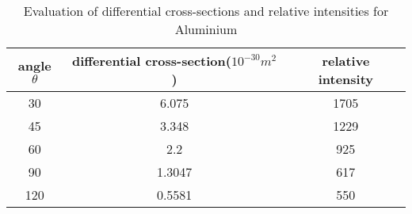 \begin{table}
    \centering
    \begin{tabular}{|c|c|c|}
        \hline
        angle $\theta$ & differential cross-section($10^{-30}m^2$) & relative intensity \\ \hline
        30             & 6.075                                     & 1705               \\ \hline
        45             & 3.348                                     & 1229               \\ \hline
        60             & 2.2                                       & 925                \\ \hline
        90             & 1.3047                                    & 617                \\ \hline
        120            & 0.5581                                    & 550                \\ \hline
    \end{tabular}
    \caption{Evaluation of differential cross-sections and relative intensities for Aluminium}
    \label{tab:4}
\end{table}